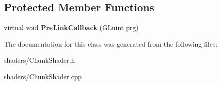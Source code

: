 \subsection*{\-Protected \-Member \-Functions}
\begin{DoxyCompactItemize}
\item 
\hypertarget{classChunkShader_ae348affb10b3fd69e97d3b64b821d44e}{virtual void {\bfseries \-Pre\-Link\-Callback} (\-G\-Luint prg)}\label{classChunkShader_ae348affb10b3fd69e97d3b64b821d44e}

\end{DoxyCompactItemize}


\-The documentation for this class was generated from the following files\-:\begin{DoxyCompactItemize}
\item 
shaders/\-Chunk\-Shader.\-h\item 
shaders/\-Chunk\-Shader.\-cpp\end{DoxyCompactItemize}
